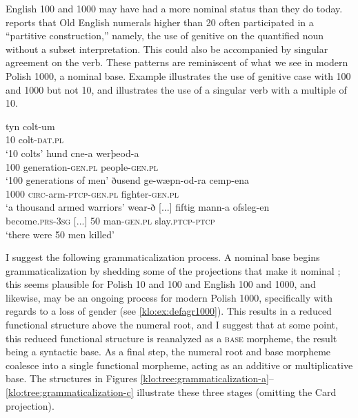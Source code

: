 \documentclass[output=paper]{langscibook}
\begin{document}
English 100 and 1000 may have had a more nominal status than they do today.  reports that Old English numerals higher than 20 often participated in a ``partitive construction,'' namely, the use of genitive on the quantified noun without a subset interpretation. This could also be accompanied by singular agreement on the verb. These patterns are reminiscent of what we see in modern Polish 1000, a nominal base. Example  illustrates the use of genitive case with 100 and 1000 but not 10, and  illustrates the use of a singular verb with a multiple of 10.

\ea \label{klo:ex:old100,1000gen,not10}
\ea \gll tyn colt-um\\
10 colt-\textsc{dat.pl}\\
\glt `10 colts'\hfill\citep[219]{von2010cardinal}
\ex \gll hund cne-a werþeod-a\\
100 generation-\textsc{gen.pl} people-\textsc{gen.pl}\\
\glt `100 generations of men'\hfill\citep[220]{von2010cardinal}
\ex \gll ðusend ge-wæpn-od-ra cemp-ena\\
1000 \textsc{circ}-arm-\textsc{ptcp-gen.pl} fighter-\textsc{gen.pl}\\
\glt `a thousand armed warriors' \hfill\citep[220]{von2010cardinal}
\z \ex \label{klo:ex:oldEngagr}
\gll wear-ð [...] fiftig mann-a ofsleg-en\\
become.\textsc{prs-3sg} [...] 50 man-\textsc{gen.pl} slay.\textsc{ptcp-ptcp} \\
\glt `there were 50 men killed' \hfill\citep[224]{von2010cardinal}
\z

\noindent I suggest the following grammaticalization process. A nominal base begins grammaticalization by shedding some of the projections that make it nominal \citep[see][]{miechowicz2014hist}; this seems plausible for Polish 10 and 100 and English 100 and 1000, and likewise, may be an ongoing process for modern Polish 1000, specifically with regards to a loss of gender (see \ref{klo:ex:defagr1000}). This results in a reduced functional structure above the numeral root, and I suggest that at some point, this reduced functional structure is reanalyzed as a \textsc{base} morpheme, the result being a syntactic base. As a final step, the numeral root and base morpheme coalesce into a single functional morpheme, acting as an additive or multiplicative base. The structures in Figures \ref{klo:tree:grammaticalization-a}--\ref{klo:tree:grammaticalization-c} illustrate these three stages (omitting the Card projection).
\end{document}
